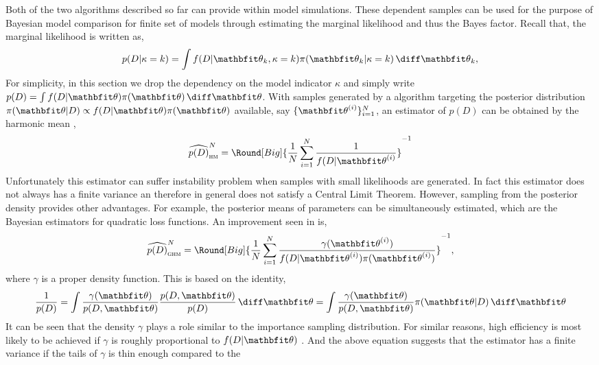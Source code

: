 \documentclass[11pt, hyper, bib, fontset=Minion]{marticle}
\begin{document}
Both of the two algorithms described so far can provide within model
simulations. These dependent samples can be used for the purpose of Bayesian
model comparison for finite set of models through estimating the marginal
likelihood and thus the Bayes factor. Recall that, the marginal likelihood is
written as,
\begin{equation*}
  p(D|\kappa = k) = \int f(D|\bth_k,\kappa=k)\pi(\bth_k|\kappa=k)\intd\bth_k,
  \label{eq:marginal likelihood}
\end{equation*}
For simplicity, in this section we drop the dependency on the model indicator
$\kappa$ and simply write $p(D) = \int f(D|\bth)\pi(\bth)\intd\bth$.  With
samples generated by a \mcmc algorithm targeting the posterior distribution
$\pi(\bth|D) \propto f(D|\bth) \pi(\bth)$ available, say $\{\bthiu\}_{i=1}^N$,
an estimator of $p(D)$ can be obtained by the harmonic mean
\parencite{Newton:1994wm},
\begin{equation}
  \widehat{p(D)}_{\text{\textsc{hm}}}^N =
  \Round[Big]{\frac{1}{N}\sum_{i=1}^N\frac{1}{f(D|\bthiu}}^{-1}
\end{equation}
Unfortunately this estimator can suffer instability problem when samples with
small likelihoods are generated. In fact this estimator does not always has a
finite variance an therefore in general does not satisfy a Central Limit
Theorem. However, sampling from the posterior density provides other
advantages. For example, the posterior means of parameters can be
simultaneously estimated, which are the Bayesian estimators for quadratic loss
functions. An improvement seen in \textcite{Kass:1995vb} is,
\begin{equation}
  \widehat{p(D)}_{\text{\textsc{ghm}}}^N = \Round[Big]{
    \frac{1}{N}\sum_{i=1}^N\frac{\gamma(\bthiu)}{f(D|\bthiu)\pi(\bthiu)}}^{-1},
\end{equation}
where $\gamma$ is a proper density function. This is based on the identity,
\begin{equation}
  \frac{1}{p(D)}
  = \int \frac{\gamma(\bth)}{p(D,\bth)} \frac{p(D,\bth)}{p(D)} \intd \bth
  = \int \frac{\gamma(\bth)}{p(D,\bth)} \pi(\bth|D) \intd \bth
\end{equation}
It can be seen that the density $\gamma$ plays a role similar to the
importance sampling distribution. For similar reasons, high efficiency is most
likely to be achieved if $\gamma$ is roughly proportional to $f(D|\bth)$
\parencite{Kass:1995vb}. And the above equation suggests that the estimator
has a finite variance if the tails of $\gamma$ is thin enough compared to the
\end{document}
